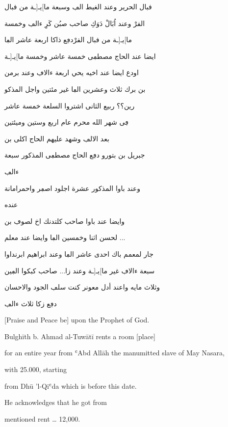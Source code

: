 \documentclass[12pt]{article}
\newcommand{\n}[1]{\bgroup\textdir TLT #1\egroup}
\begin{document}
\begin{pages}
\begin{Leftside}
\begin{txarab}
ڧبال الحرير وعند الغيط  الڢ وسبعة ما]يـ[ـة من ڧبال

الڧرْ وعند اُبَالْ دَوَكِ صاحب صبُن كَرِِ ءالڢ وخمسة

ما]يـ[ـة من ڧبال الڧرْدڢع ذاكا اربعة عاشر الڢا

ايضا عند الحاج مصطڢى خمسة عاشر وخمسة ما]يـ[ـة

اودع ايضا عند اخيه يحي اربعة ءالاڢ وعند برمن

بن برك ثلاث وعشرين الڢا غير مئتين واجل المذكو

رين؟؟ ربيع الثانى اشتروا السلعة خمسة عاشر

ڢى شهر الله محرم عام اربع وستين وميئتين

بعد الالڢ\arnote{ديسمبر  \n{1847}} وشهد عليهم الحاج اكلى بن

جبريل بن بتورو دڢع الحاج مصطڢى المذكور سبعة

ءالڢ

وعند باوا المذكور عشرة اجلود اصڢر واحمرامانة

عنده

وايضا عند باوا صاحب كلتدنك اخ لصوڢ بن

لحسن اثنا وخمسين الڢا وايضا عند معلم ...

جار لمعمم باك احدى عاشر الڢا وعند ابراهيم ابرنداوا

سبعة ءالاڢ غير ما]يـ[ـة وعند زا... صاحب كبكوا الڢين


وثلاث مايه واعند أدل معونر كنت سلڢ الجود والاحسان

دڢع زكا ثلاث ءالڢ
\end{txarab}
\pend
\endnumbering
\end{Leftside}


\begin{Rightside}

  
\beginnumberingR
\pstart[]

 \parindent=0pt
[Praise and Peace be] upon the Prophet of God.

Bulghīth b. Ahmad al-Tuwātī rents a room [place]

 for an entire year from ʿAbd Allāh the manumitted slave of May Nasara,

 with 25.000, starting

from Dhū 'l-Qiʿda which is before this date.

He acknowledges that he got from

mentioned rent {\dots} 12,000.


\end{Rightside}
\end{pages}
\end{document}
